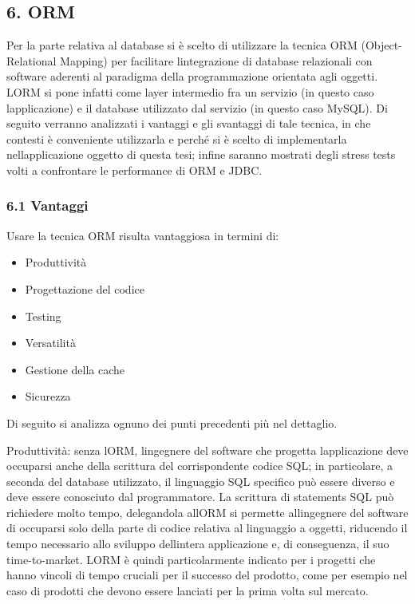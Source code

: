 \documentclass[
]{article}
\providecommand{\tightlist}{%
  \setlength{\itemsep}{0pt}\setlength{\parskip}{0pt}}
\begin{document}
\subsection{6. ORM}\label{orm}

Per la parte relativa al database si è scelto di utilizzare la tecnica
ORM (Object-Relational Mapping) per facilitare
l\textquotesingle integrazione di database relazionali con software
aderenti al paradigma della programmazione orientata agli oggetti.
L\textquotesingle ORM si pone infatti come layer intermedio fra un
servizio (in questo caso l\textquotesingle applicazione) e il database
utilizzato dal servizio (in questo caso MySQL). Di seguito verranno
analizzati i vantaggi e gli svantaggi di tale tecnica, in che contesti è
conveniente utilizzarla e perché si è scelto di implementarla
nell\textquotesingle applicazione oggetto di questa tesi; infine saranno
mostrati degli stress tests volti a confrontare le performance di ORM e
JDBC.

\subsubsection{6.1 Vantaggi}\label{vantaggi}

Usare la tecnica ORM risulta vantaggiosa in termini di:

\begin{itemize}
\tightlist
\item
  Produttività
\item
  Progettazione del codice
\item
  Testing
\item
  Versatilità
\item
  Gestione della cache
\item
  Sicurezza
\end{itemize}

Di seguito si analizza ognuno dei punti precedenti più nel dettaglio.

Produttività: senza l\textquotesingle ORM, l\textquotesingle ingegnere
del software che progetta l\textquotesingle applicazione deve occuparsi
anche della scrittura del corrispondente codice SQL; in particolare, a
seconda del database utilizzato, il linguaggio SQL specifico può essere
diverso e deve essere conosciuto dal programmatore. La scrittura di
statements SQL può richiedere molto tempo, delegandola
all\textquotesingle ORM si permette all\textquotesingle ingegnere del
software di occuparsi solo della parte di codice relativa al linguaggio
a oggetti, riducendo il tempo necessario allo sviluppo
dell\textquotesingle intera applicazione e, di conseguenza, il suo
time-to-market. L\textquotesingle ORM è quindi particolarmente indicato
per i progetti che hanno vincoli di tempo cruciali per il successo del
prodotto, come per esempio nel caso di prodotti che devono essere
lanciati per la prima volta sul mercato.
\end{document}

